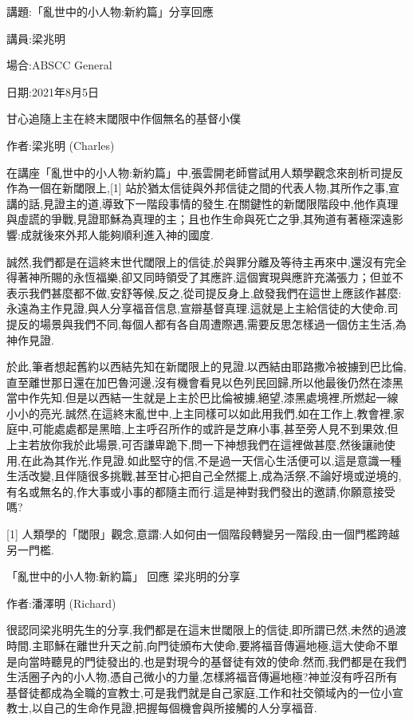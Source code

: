 \documentclass{book}
\begin{document}
講題:「亂世中的小人物:新約篇」分享回應

講員:梁兆明

場合:ABSCC General

日期:2021年8月5日

甘心追隨上主在終末閾限中作個無名的基督小僕

作者:梁兆明 (Charles)

在講座「亂世中的小人物:新約篇」中,張雲開老師嘗試用人類學觀念來剖析司提反作為一個在新閾限上,[1] 站於猶太信徒與外邦信徒之間的代表人物,其所作之事,宣講的話,見證主的道,導致下一階段事情的發生.在關鍵性的新閾限階段中,他作真理與虛謊的爭戰,見證耶穌為真理的主；且也作生命與死亡之爭,其殉道有著極深遠影響:成就後來外邦人能夠順利進入神的國度.

誠然,我們都是在這終末世代閾限上的信徒,於與罪分離及等待主再來中,還沒有完全得著神所賜的永恆福樂,卻又同時領受了其應許,這個實現與應許充滿張力；但並不表示我們甚麼都不做,安舒等候,反之,從司提反身上,啟發我們在這世上應該作甚麼:永遠為主作見證,與人分享福音信息,宣辯基督真理.這就是上主給信徒的大使命.司提反的場景與我們不同,每個人都有各自周遭際遇,需要反思怎樣過一個仿主生活,為神作見證.

於此,筆者想起舊約以西結先知在新閾限上的見證.以西結由耶路撒冷被擄到巴比倫,直至離世那日還在加巴魯河邊,沒有機會看見以色列民回歸,所以他最後仍然在漆黑當中作先知.但是以西結一生就是上主於巴比倫被擄,絕望,漆黑處境裡,所燃起一線小小的亮光.誠然,在這終末亂世中,上主同樣可以如此用我們,如在工作上,教會裡,家庭中,可能處處都是黑暗,上主呼召所作的或許是芝麻小事,甚至旁人見不到果效,但上主若放你我於此場景,可否謙卑跪下,問一下神想我們在這裡做甚麼,然後讓祂使用,在此為其作光,作見證.如此堅守的信,不是過一天信心生活便可以,這是意識一種生活改變,且伴隨很多挑戰,甚至甘心把自己全然擺上,成為活祭,不論好境或逆境的,有名或無名的,作大事或小事的都隨主而行.這是神對我們發出的邀請,你願意接受嗎?

[1]  人類學的「閾限」觀念,意謂:人如何由一個階段轉變另一階段,由一個門檻跨越另一門檻.

 「亂世中的小人物:新約篇」 回應 梁兆明的分享

作者:潘澤明 (Richard)

很認同梁兆明先生的分享,我們都是在這末世閾限上的信徒,即所謂已然,未然的過渡時間.主耶穌在離世升天之前,向門徒頒布大使命,要將福音傳遍地極,這大使命不單是向當時聽見的門徒發出的,也是對現今的基督徒有效的使命.然而,我們都是在我們生活圈子內的小人物,憑自己微小的力量,怎樣將福音傳遍地極?神並沒有呼召所有基督徒都成為全職的宣教士,可是我們就是自己家庭,工作和社交領域內的一位小宣教士,以自己的生命作見證,把握每個機會與所接觸的人分享福音.
\end{document}
